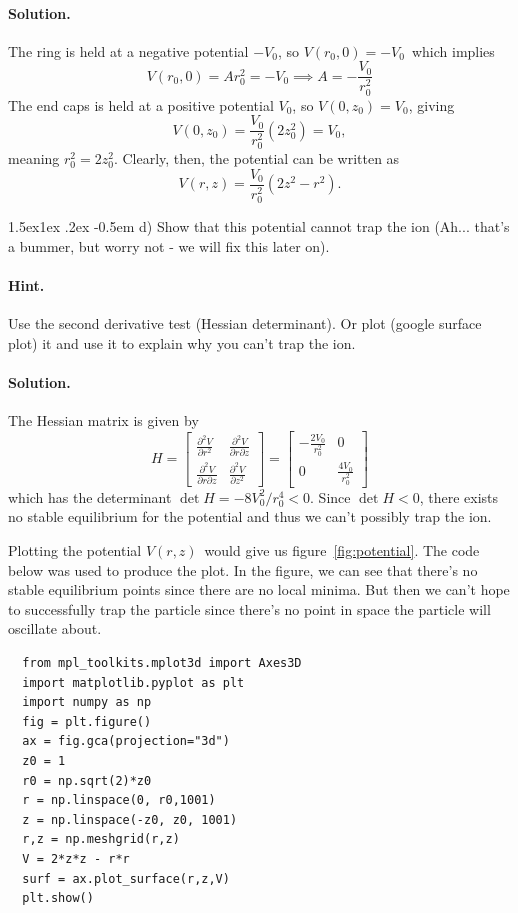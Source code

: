\documentclass[%
oneside,                 %
final,                   %
10pt]{article}
\makeatletter
\newenvironment{doconceexercise}{}{}
\newcommand\subex{\@startsection{paragraph}{4}{\z@}%
                  {1.5ex\@plus1ex \@minus.2ex}%
                  {-0.5em}%
                  {\normalfont\normalsize\bfseries}}
\makeatother
\begin{document}
\begin{doconceexercise}
\paragraph{Solution.}
The ring is held at a negative potential $-V_0$, so $V(r_0, 0) = -V_0$ which implies
$$ V(r_0, 0) = Ar_0^2 = -V_0 \implies A = -\frac{V_0}{r_0^2}$$
The end caps is held at a positive potential $V_0$, so $V(0,z_0) = V_0$, giving
$$ V(0, z_0) = \frac{V_0}{r_0^2}(2z_0^2) = V_0,$$
meaning $r_0^2 = 2z_0^2$. Clearly, then, the potential can be written as
$$ V(r,z) = \frac{V_0}{r_0^2}(2z^2 - r^2).$$


\subex{d)}
Show that this potential cannot trap the ion (Ah... that's a bummer, but worry not - we will fix this later on).


\paragraph{Hint.}
Use the second derivative test (Hessian determinant). Or plot (google surface plot) it and use it to explain why you can't trap the ion.



\paragraph{Solution.}
The Hessian matrix is given by
$$
H =
  \begin{bmatrix}
    \frac{\partial^2 V}{\partial r^2} & \frac{\partial^2 V}{\partial r \partial z} \\
    \frac{\partial^2 V}{\partial r \partial z} & \frac{\partial^2 V}{\partial z^2}
  \end{bmatrix}
  =
  \begin{bmatrix}
    -\frac{2V_0}{r_0^2} & 0 \\
    0 & \frac{4V_0}{r_0^2}
  \end{bmatrix}
$$
which has the determinant $\det H = -8V_0^2/r_0^4 < 0 $. Since $\det H < 0$, there exists no stable equilibrium for the potential and thus we can't possibly trap the ion.

Plotting the potential $V(r,z)$ would give us figure~\ref{fig:potential}. The code below was used to produce the plot. In the figure, we can see that there's no stable equilibrium points since there
are no local minima. But then we can't hope to successfully trap the particle since there's no point in space the particle will oscillate about.
\begin{verbatim}
  from mpl_toolkits.mplot3d import Axes3D
  import matplotlib.pyplot as plt
  import numpy as np
  fig = plt.figure()
  ax = fig.gca(projection="3d")
  z0 = 1
  r0 = np.sqrt(2)*z0
  r = np.linspace(0, r0,1001)
  z = np.linspace(-z0, z0, 1001)
  r,z = np.meshgrid(r,z)
  V = 2*z*z - r*r
  surf = ax.plot_surface(r,z,V)
  plt.show()
\end{verbatim}



\end{doconceexercise}
\end{document}
